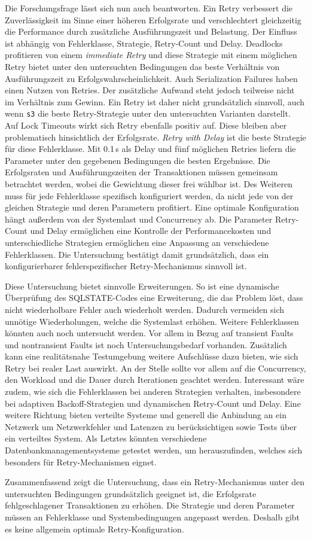 Die Forschungsfrage lässt sich nun auch beantworten.
Ein Retry verbessert die Zuverlässigkeit im Sinne einer höheren Erfolgsrate und verschlechtert gleichzeitig die
Performance durch zusätzliche Ausführungszeit und Belastung.
Der Einfluss ist abhängig von Fehlerklasse, Strategie, Retry-Count und Delay.
Deadlocks profitieren von einem \emph{immediate Retry} und diese Strategie mit einem möglichen Retry bietet unter
den untersuchten Bedingungen das beste Verhältnis von Ausführungszeit zu Erfolgswahrscheinlichkeit.
Auch Serialization Failures haben einen Nutzen von Retries.
Der zusätzliche Aufwand steht jedoch teilweise nicht im Verhältnis zum Gewinn.
Ein Retry ist daher nicht grundsätzlich sinnvoll, auch wenn \texttt{s3} die beste Retry-Strategie unter den
untersuchten Varianten darstellt.
Auf Lock Timeouts wirkt sich Retry ebenfalls positiv auf.
Diese bleiben aber problematisch hinsichtlich der Erfolgsrate.
\emph{Retry with Delay} ist die beste Strategie für diese Fehlerklasse.
Mit 0.1\,s als Delay und fünf möglichen Retries liefern die Parameter unter den gegebenen Bedingungen die besten Ergebnisse.
Die Erfolgsraten und Ausführungszeiten der Transaktionen müssen gemeinsam betrachtet werden, wobei die Gewichtung
dieser frei wählbar ist.
Des Weiteren muss für jede Fehlerklasse spezifisch konfiguriert werden, da nicht jede von der gleichen Strategie und
deren Parametern profitiert.
Eine optimale Konfiguration hängt außerdem von der Systemlast und Concurrency ab.
Die Parameter Retry-Count und Delay ermöglichen eine Kontrolle der Performancekosten und unterschiedliche Strategien
ermöglichen eine Anpassung an verschiedene Fehlerklassen.
Die Untersuchung bestätigt damit grundsätzlich, dass ein konfigurierbarer fehlerspezifischer Retry-Mechanismus
sinnvoll ist.

Diese Untersuchung bietet sinnvolle Erweiterungen.
So ist eine dynamische Überprüfung des SQLSTATE-Codes eine Erweiterung, die das Problem löst, dass nicht wiederholbare
Fehler auch wiederholt werden.
Dadurch vermeiden sich unnötige Wiederholungen, welche die Systemlast erhöhen.
Weitere Fehlerklassen könnten auch noch untersucht werden.
Vor allem in Bezug auf transient Faults und nontransient Faults ist noch Untersuchungsbedarf vorhanden.
Zusätzlich kann eine realitätsnahe Testumgebung weitere Aufschlüsse dazu bieten, wie sich Retry bei realer Last
auswirkt.
An der Stelle sollte vor allem auf die Concurrency, den Workload und die Dauer durch Iterationen geachtet werden.
Interessant wäre zudem, wie sich die Fehlerklassen bei anderen Strategien verhalten, insbesondere bei adaptiven
Backoff-Strategien und dynamischen Retry-Count und Delay.
Eine weitere Richtung bieten verteilte Systeme und generell die Anbindung an ein Netzwerk um Netzwerkfehler und
Latenzen zu berücksichtigen sowie Tests über ein verteiltes System.
Als Letztes könnten verschiedene Datenbankmanagementsysteme getestet werden, um herauszufinden, welches sich
besonders für Retry-Mechanismen eignet.

Zusammenfassend zeigt die Untersuchung, dass ein Retry-Mechanismus unter den untersuchten Bedingungen grundsätzlich
geeignet ist, die Erfolgsrate fehlgeschlagener Transaktionen zu erhöhen.
Die Strategie und deren Parameter müssen an Fehlerklasse und Systembedingungen angepasst werden.
Deshalb gibt es keine allgemein optimale Retry-Konfiguration.